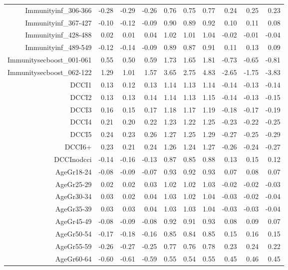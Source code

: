 \begin{table}[ht]
\begin{tabular}{rrrrrrrrrr}
  Immunityinf\_306-366 & -0.28 & -0.29 & -0.26 & 0.76 & 0.75 & 0.77 & 0.24 & 0.25 & 0.23 \\ 
  Immunityinf\_367-427 & -0.10 & -0.12 & -0.09 & 0.90 & 0.89 & 0.92 & 0.10 & 0.11 & 0.08 \\ 
  Immunityinf\_428-488 & 0.02 & 0.01 & 0.04 & 1.02 & 1.01 & 1.04 & -0.02 & -0.01 & -0.04 \\ 
  Immunityinf\_489-549 & -0.12 & -0.14 & -0.09 & 0.89 & 0.87 & 0.91 & 0.11 & 0.13 & 0.09 \\ 
  Immunitysecboost\_001-061 & 0.55 & 0.50 & 0.59 & 1.73 & 1.65 & 1.81 & -0.73 & -0.65 & -0.81 \\ 
  Immunitysecboost\_062-122 & 1.29 & 1.01 & 1.57 & 3.65 & 2.75 & 4.83 & -2.65 & -1.75 & -3.83 \\ 
  DCCI1 & 0.13 & 0.12 & 0.13 & 1.14 & 1.13 & 1.14 & -0.14 & -0.13 & -0.14 \\ 
  DCCI2 & 0.13 & 0.13 & 0.14 & 1.14 & 1.13 & 1.15 & -0.14 & -0.13 & -0.15 \\ 
  DCCI3 & 0.16 & 0.15 & 0.17 & 1.18 & 1.17 & 1.19 & -0.18 & -0.17 & -0.19 \\ 
  DCCI4 & 0.21 & 0.20 & 0.22 & 1.23 & 1.22 & 1.25 & -0.23 & -0.22 & -0.25 \\ 
  DCCI5 & 0.24 & 0.23 & 0.26 & 1.27 & 1.25 & 1.29 & -0.27 & -0.25 & -0.29 \\ 
  DCCI6+ & 0.23 & 0.21 & 0.24 & 1.26 & 1.24 & 1.27 & -0.26 & -0.24 & -0.27 \\ 
  DCCInodcci & -0.14 & -0.16 & -0.13 & 0.87 & 0.85 & 0.88 & 0.13 & 0.15 & 0.12 \\ 
  AgeGr18-24 & -0.08 & -0.09 & -0.07 & 0.93 & 0.92 & 0.93 & 0.07 & 0.08 & 0.07 \\ 
  AgeGr25-29 & 0.02 & 0.02 & 0.03 & 1.02 & 1.02 & 1.03 & -0.02 & -0.02 & -0.03 \\ 
  AgeGr30-34 & 0.03 & 0.02 & 0.04 & 1.03 & 1.02 & 1.04 & -0.03 & -0.02 & -0.04 \\ 
  AgeGr35-39 & 0.03 & 0.03 & 0.04 & 1.03 & 1.03 & 1.04 & -0.03 & -0.03 & -0.04 \\ 
  AgeGr45-49 & -0.08 & -0.09 & -0.08 & 0.92 & 0.91 & 0.93 & 0.08 & 0.09 & 0.07 \\ 
  AgeGr50-54 & -0.17 & -0.18 & -0.16 & 0.85 & 0.84 & 0.85 & 0.15 & 0.16 & 0.15 \\ 
  AgeGr55-59 & -0.26 & -0.27 & -0.25 & 0.77 & 0.76 & 0.78 & 0.23 & 0.24 & 0.22 \\ 
  AgeGr60-64 & -0.60 & -0.61 & -0.59 & 0.55 & 0.54 & 0.55 & 0.45 & 0.46 & 0.45 \\ 

\end{tabular}
\end{table}
